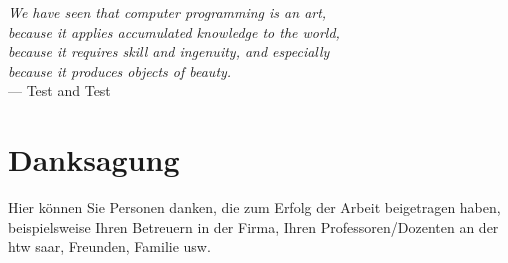 
\begin{flushright}{\slshape
        We have seen that computer programming is an art, \\
        because it applies accumulated knowledge to the world, \\
        because it requires skill and ingenuity, and especially \\
        because it produces objects of beauty.} \\ \medskip
    --- Test \cite{bastienscapin} and Test \cite{usability}
\end{flushright}

\bigskip

\begingroup
\let\clearpage\relax
\let\cleardoublepage\relax
\let\cleardoublepage\relax
\chapter*{Danksagung}
Hier können Sie Personen danken, die zum Erfolg der Arbeit beigetragen haben, beispielsweise Ihren Betreuern in der Firma, Ihren Professoren/Dozenten an der htw saar, Freunden, Familie usw.




\endgroup

